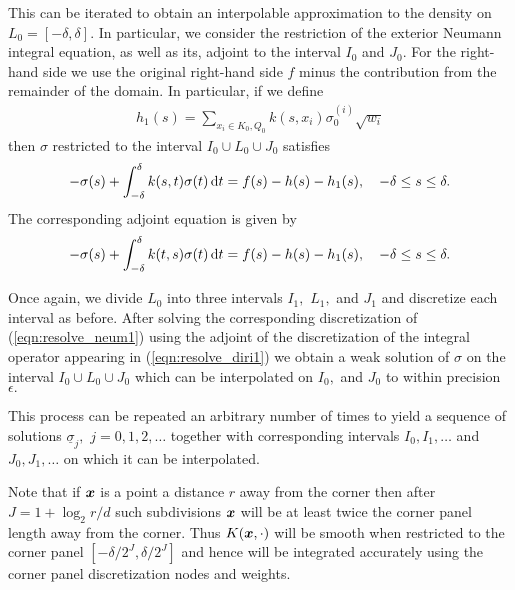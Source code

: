 This can be iterated to obtain an interpolable approximation to the density on $L_0 = [-\delta,\delta].$ In particular, we consider the restriction of the exterior Neumann integral equation, as well as its, adjoint to the interval $I_0$ and $J_0.$ For the right-hand side we use the original right-hand side $f$ minus the contribution from the remainder of the domain. In particular, if we define
\begin{align}
h_1(s) = \sum_{x_i \in K_0,Q_0} k(s,x_i) \sigma_0^{(i)} \sqrt{w_i}
\end{align}
then $\sigma$ restricted to the interval $I_0\cup L_0 \cup J_0$ satisfies
\begin{align}\label{eqn:resolve_neum1}
-\sigma(s) + \int_{-\delta}^{\delta} k(s,t) \sigma(t)\,{\rm d} t = f(s)-h(s)-h_1(s), \quad -\delta \le s \le \delta.
\end{align}
The corresponding adjoint equation is given by 
\begin{align}\label{eqn:resolve_diri1}
-\sigma(s) + \int_{-\delta}^{\delta} k(t,s) \sigma(t)\,{\rm d} t = f(s)-h(s)-h_1(s), \quad -\delta \le s \le \delta.
\end{align}

Once again, we divide $L_0$ into three intervals $I_1,$ $L_1,$ and $J_1$ and discretize each interval as before. After solving the corresponding discretization of (\ref{eqn:resolve_neum1}) using the adjoint of the discretization of the integral operator appearing in (\ref{eqn:resolve_diri1}) we obtain a weak solution of $\sigma$ on the interval $I_0\cup L_0 \cup J_0$ which can be interpolated on $I_0,$ and $J_0$ to within precision $\epsilon.$

This process can be repeated an arbitrary number of times to yield a sequence of solutions $\underline{\sigma}_j,$ $j=0,1,2,\dots$ together with corresponding intervals $I_0,I_1,\dots$ and $J_0,J_1,\dots$ on which it can be interpolated.

Note that if $\boldsymbol{x}$ is a point a distance $r$ away from the corner then after $J=1+\log_2 r/d$ such subdivisions $\boldsymbol{x}$ will be at least twice the corner panel length away from the corner. Thus $K(\boldsymbol{x},\cdot)$ will be smooth when restricted to the corner panel $[-\delta/2^{J},\delta/2^J]$ and hence will be integrated accurately using the corner panel discretization nodes and weights.
